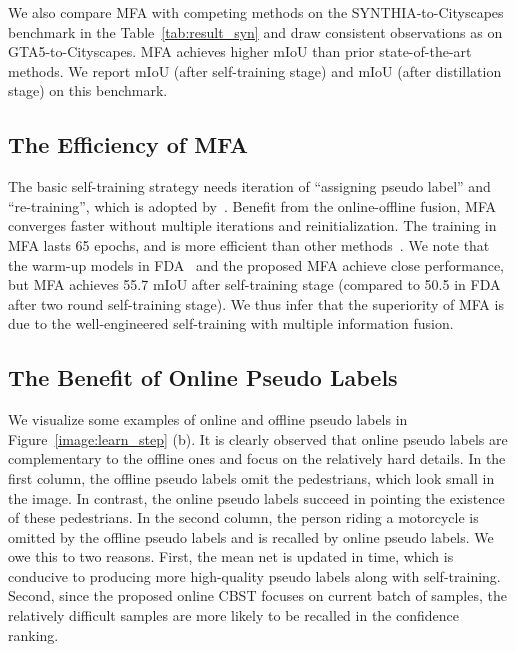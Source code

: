 \documentclass{bmvc2k}
\begin{document}
We also compare MFA with competing methods on the SYNTHIA-to-Cityscapes benchmark in the Table~\ref{tab:result_syn} and draw consistent observations as on GTA5-to-Cityscapes. MFA achieves higher mIoU than prior state-of-the-art methods. We report  mIoU (after self-training stage) and  mIoU (after distillation stage) on this benchmark. 

\subsection{The Efficiency of MFA}
The basic self-training strategy needs iteration of ``assigning pseudo label'' and ``re-training'', which is adopted by~\cite{RN162,RN180}. Benefit from the online-offline fusion, MFA converges faster without multiple iterations and reinitialization. The training in MFA lasts 65 epochs, and is more efficient than other methods~\cite{RN132,RN180,zhang2021prototypical,RN162}. We note that the warm-up models in FDA~\cite{RN180} and the proposed MFA achieve close performance, but MFA achieves 55.7 mIoU after self-training stage (compared to 50.5 in FDA after two round self-training stage). We thus infer that the superiority of MFA is due to the well-engineered self-training with multiple information fusion. 


\subsection{The Benefit of Online Pseudo Labels} \label{sec:Role of Online}
We visualize some examples of online and offline pseudo labels in Figure~\ref{image:learn_step} (b). It is clearly observed that online pseudo labels are complementary to the offline ones and focus on the relatively hard details. In the first column, the offline pseudo labels omit the pedestrians, which look small in the image. In contrast, the online pseudo labels succeed in pointing the existence of these pedestrians. In the second column, the person riding a motorcycle is omitted by the offline pseudo labels and is recalled by online pseudo labels. We owe this to two reasons. First, the mean net is updated in time, which is conducive to producing more high-quality pseudo labels along with self-training. Second, since the proposed online CBST focuses on current batch of samples, the relatively difficult samples are more likely to be recalled in the confidence ranking.
\end{document}
